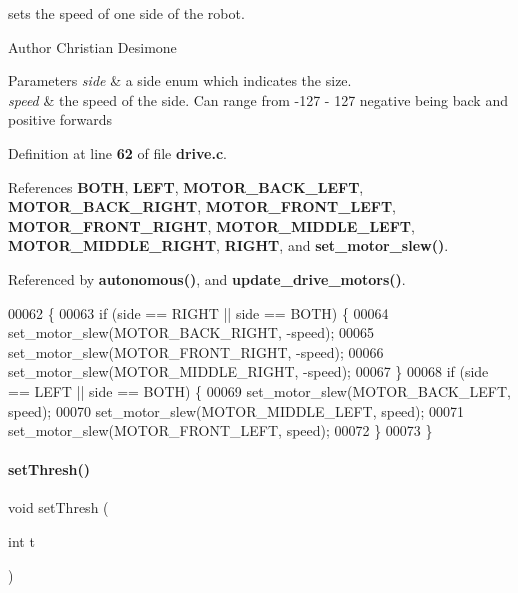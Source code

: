 sets the speed of one side of the robot. 

\begin{DoxyAuthor}{Author}
Christian Desimone 
\end{DoxyAuthor}

\begin{DoxyParams}{Parameters}
{\em side} & a side enum which indicates the size. \\
\hline
{\em speed} & the speed of the side. Can range from -\/127 -\/ 127 negative being back and positive forwards \\
\hline
\end{DoxyParams}


Definition at line \textbf{ 62} of file \textbf{ drive.\+c}.



References \textbf{ B\+O\+TH}, \textbf{ L\+E\+FT}, \textbf{ M\+O\+T\+O\+R\+\_\+\+B\+A\+C\+K\+\_\+\+L\+E\+FT}, \textbf{ M\+O\+T\+O\+R\+\_\+\+B\+A\+C\+K\+\_\+\+R\+I\+G\+HT}, \textbf{ M\+O\+T\+O\+R\+\_\+\+F\+R\+O\+N\+T\+\_\+\+L\+E\+FT}, \textbf{ M\+O\+T\+O\+R\+\_\+\+F\+R\+O\+N\+T\+\_\+\+R\+I\+G\+HT}, \textbf{ M\+O\+T\+O\+R\+\_\+\+M\+I\+D\+D\+L\+E\+\_\+\+L\+E\+FT}, \textbf{ M\+O\+T\+O\+R\+\_\+\+M\+I\+D\+D\+L\+E\+\_\+\+R\+I\+G\+HT}, \textbf{ R\+I\+G\+HT}, and \textbf{ set\+\_\+motor\+\_\+slew()}.



Referenced by \textbf{ autonomous()}, and \textbf{ update\+\_\+drive\+\_\+motors()}.


\begin{DoxyCode}
00062                                             \{
00063   \textcolor{keywordflow}{if} (side == RIGHT || side == BOTH) \{
00064     set_motor_slew(MOTOR_BACK_RIGHT, -speed);
00065     set_motor_slew(MOTOR_FRONT_RIGHT, -speed);
00066     set_motor_slew(MOTOR_MIDDLE_RIGHT, -speed);
00067   \}
00068   \textcolor{keywordflow}{if} (side == LEFT || side == BOTH) \{
00069     set_motor_slew(MOTOR_BACK_LEFT, speed);
00070     set_motor_slew(MOTOR_MIDDLE_LEFT, speed);
00071     set_motor_slew(MOTOR_FRONT_LEFT, speed);
00072   \}
00073 \}
\end{DoxyCode}
\mbox{\label{a00092_a53d6e35d53ec3e0b1b1c489d8203f204}} 
\paragraph{set\+Thresh()}
{\footnotesize\ttfamily void set\+Thresh (\begin{DoxyParamCaption}\item[{int}]{t }\end{DoxyParamCaption})}



